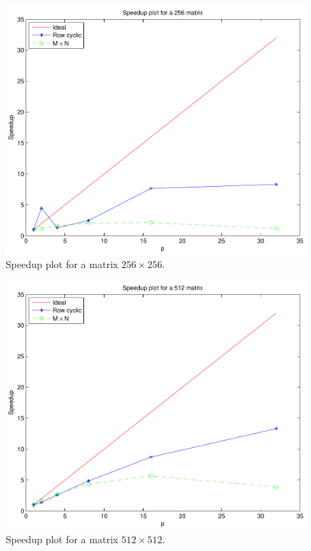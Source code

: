 \documentclass[a4paper,11pt]{article}
\begin{document}
\begin{figure}[H]
\begin{center}
 \includegraphics[scale=0.6]{img/256.pdf}
\caption{Speedup plot for a matrix $256\times256$.}
\end{center}
\end{figure}

\begin{figure}[H]
\begin{center}
 \includegraphics[scale=0.6]{img/512.pdf}
\caption{Speedup plot for a matrix $512\times512$.}
\end{center}
\end{figure}
\end{document}
